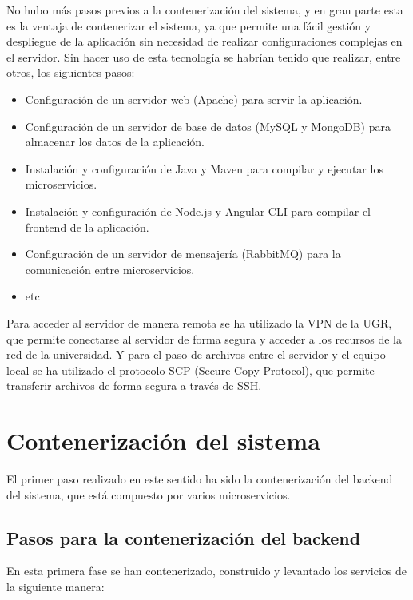 No hubo más pasos previos a la contenerización del sistema, y en gran parte esta es la ventaja de contenerizar el sistema, ya que permite una fácil gestión y despliegue de la aplicación sin necesidad de realizar configuraciones complejas en el servidor.
\newline\newline
Sin hacer uso de esta tecnología se habrían tenido que realizar, entre otros, los siguientes pasos:
\begin{itemize}
    \item Configuración de un servidor web (Apache) para servir la aplicación.
    \item Configuración de un servidor de base de datos (MySQL y MongoDB) para almacenar los datos de la aplicación.
    \item Instalación y configuración de Java y Maven para compilar y ejecutar los microservicios.
    \item Instalación y configuración de Node.js y Angular CLI para compilar el frontend de la aplicación.
    \item Configuración de un servidor de mensajería (RabbitMQ) para la comunicación entre microservicios.
    \item etc
\end{itemize}

Para acceder al servidor de manera remota se ha utilizado la VPN de la UGR, que permite conectarse al servidor de forma segura y acceder a los recursos de la red de la universidad.
\newline
Y para el paso de archivos entre el servidor y el equipo local se ha utilizado el protocolo SCP (Secure Copy Protocol), que permite transferir archivos de forma segura a través de SSH.
\section{Contenerización del sistema}

El primer paso realizado en este sentido ha sido la contenerización del backend del sistema, que está compuesto por varios microservicios. 

\subsection{Pasos para la contenerización del backend}

En esta primera fase se han contenerizado, construido y levantado los servicios de la siguiente manera:

